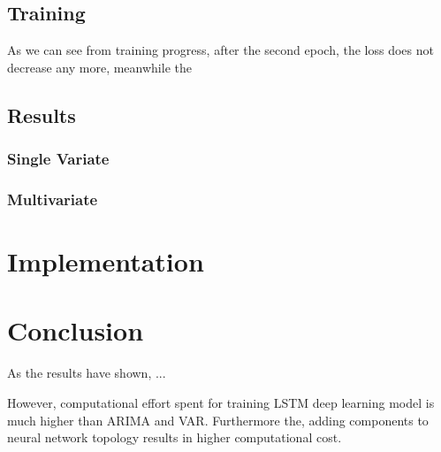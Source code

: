 \documentclass[11pt]{article}
\begin{document}
\subsection{Training}
As we can see from training progress, after the second epoch, the loss does not decrease any more, meanwhile the
\subsection{Results}

\subsubsection{Single Variate}

\subsubsection{Multivariate}

\section{Implementation}

\section{Conclusion}
As the results have shown, ...

However, computational effort spent for training LSTM deep learning model is
much higher than ARIMA and VAR. Furthermore the, adding components to neural network
topology results in higher computational cost. 

\pagebreak


\end{document}
